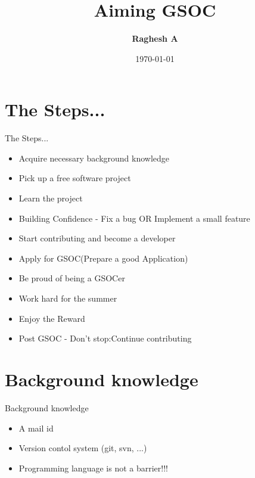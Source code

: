 \documentclass{beamer}
\title{Aiming GSOC}
\author{\textbf{Raghesh A}}
\date{\today}
\begin{document}
\begin{frame}
\titlepage
\end{frame}

\section[Outline]{}
\frame{\tableofcontents}

\section{The Steps...}
\begin{frame}{The Steps...}
\begin{itemize}
\item Acquire necessary background knowledge
\item Pick up a free software project
\item Learn the project
\item Building Confidence - Fix a bug OR Implement a small feature
\item Start contributing and become a developer
\item Apply for GSOC(Prepare a good Application)
\item Be proud of being a GSOCer
\item Work hard for the summer
\item Enjoy the Reward
\item Post GSOC - Don't stop:Continue contributing
\end{itemize}
\end{frame}

\section{Background knowledge}
\begin{frame}{Background knowledge}
\begin{itemize}
\item A mail id
\item Version contol system (git, svn, ...)
\item Programming language is not a barrier!!!
\end{itemize}
\end{frame}
\end{document}
